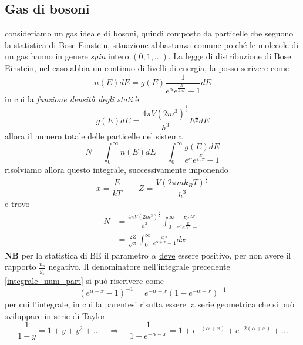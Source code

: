 \subsection{Gas di bosoni} consideriamo un gas ideale di bosoni, quindi composto da particelle che seguono la statistica di Bose Einstein, situazione abbastanza comune poiché le molecole di un gas hanno in genere \textit{spin} intero $(0, 1, ...)$.
La legge di distribuzione di Bose Einstein, nel caso abbia un continuo di livelli di energia, la posso scrivere come
\begin{equation}
n(E)dE = g(E) \frac{1}{e^{ \alpha } e^{ \frac{E}{k_B T} } - 1 } dE
\end{equation}
in cui la \textit{funzione densità degli stati} è
\begin{equation}
g(E)dE = \frac{4\pi V (2m^3)^{ \frac{1}{2} }}{h^3} E^{\frac{1}{2} } dE
\end{equation}
allora il numero totale delle particelle nel sistema
\begin{equation}
N = \int_0^{\infty} n(E)dE =  \int_0^{\infty} \frac{g(E) dE}{e^{\alpha} e^{ \frac{E}{k_B T} } - 1} 
\end{equation}
risolviamo allora questo integrale, successivamente imponendo
\begin{equation}
x = \frac{E}{kT} \quad\quad Z = \frac{V (2 \pi m k_B T)^{ \frac{3}{2} } }{h^3}
\end{equation}
e trovo
\begin{equation}
\begin{split}
N & = \frac{4\pi V (2m^3)^{ \frac{1}{2} }}{h^3} \int_0^{\infty} \frac{E^{ \frac{1}{2} dE }}{e^{\alpha} e^{ \frac{E}{k_B T} } - 1}  \\
&= \frac{2Z}{\sqrt{\pi}} \int_0^{\infty} \frac{x^{ \frac{1}{2} }}{e^{ \alpha + x } - 1} dx
\label{integrale_num_part}
\end{split}
\end{equation}
\textbf{NB} per la statistica di BE il parametro $\alpha$ \underline{deve} essere positivo, per non avere il rapporto $\frac{n_s}{g_s}$ negativo.
Il denominatore nell'integrale precedente \ref{integrale_num_part} si può riscrivere come
\begin{equation}
(e^{ \alpha + x } - 1)^{-1} = e^{ - \alpha - x } (1 - e^{ - \alpha - x })^{ -1 }
\end{equation}
per cui l'integrale, in cui la parentesi risulta essere la serie geometrica che si può sviluppare in serie di Taylor
$$ \frac{1}{1-y} = 1 + y + y^2 + ... \quad\Rightarrow\quad \frac{1}{1 - e^{ -\alpha - x }} = 1 + e^{ - ( \alpha + x) } + e^{ - 2 ( \alpha + x) } + ... $$
